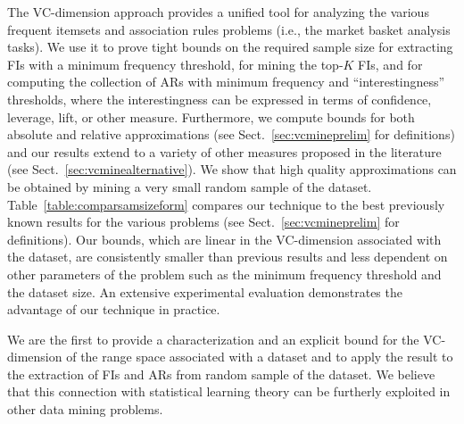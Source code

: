 The VC-dimension approach provides a unified tool for analyzing the various
frequent itemsets and association rules problems (i.e., the market basket
analysis tasks). We use it to prove tight bounds on the required
sample size for extracting FIs with a minimum frequency threshold, for mining
the top-$K$ FIs, and for computing the collection of ARs with minimum
frequency and ``interestingness'' thresholds, where the interestingness can be
expressed in terms of confidence, leverage, lift, or other measure.
Furthermore, we compute bounds for both absolute and relative approximations
(see
Sect.~\ref{sec:vcmineprelim} for definitions) and our results extend to a variety
of other measures proposed in the literature (see Sect.~\ref{sec:vcminealternative}).
We show that high quality approximations can be obtained by mining a very small
random sample of the dataset. Table~\ref{table:comparsamsizeform} compares our
technique to the best previously known results for the various problems (see
Sect.~\ref{sec:vcmineprelim} for definitions). Our bounds, which are linear in the
VC-dimension associated with the dataset, are consistently smaller than previous
results and less dependent on other parameters of the problem such as the
minimum frequency threshold and the dataset size. An extensive
experimental evaluation demonstrates the advantage of our technique in practice.

We are the first to provide a characterization and an explicit bound for
the VC-dimension of the range space associated with a dataset and to apply the
result to the extraction of FIs and ARs from random sample of the dataset. We
believe that this connection with statistical learning theory can be furtherly
exploited in other data mining problems.

